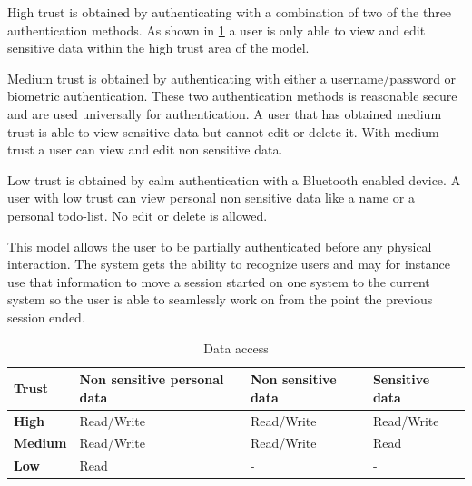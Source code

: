 High trust is obtained by authenticating with a combination of two of the three authentication methods.
As shown in \cref{table_data_access} a user is only able to view and edit sensitive data within the high trust area of the model.

Medium trust is obtained by authenticating with either a username/password or biometric authentication.
These two authentication methods is reasonable secure and are used universally for authentication.
A user that has obtained medium trust is able to view sensitive data but cannot edit or delete it.
With medium trust a user can view and edit non sensitive data.

Low trust is obtained by calm authentication with a Bluetooth enabled device.
A user with low trust can view personal non sensitive data like a name or a personal todo-list.
No edit or delete is allowed.

This model allows the user to be partially authenticated before any physical interaction.
The system gets the ability to recognize users and may for instance use that information to move a session started on one system to the current system so the user is able to seamlessly work on from the point the previous session ended.

\begin{table}[!t]
\caption{Data access}
\label{table_data_access}
\centering
\begin{tabular}{|p{1.3cm}|p{2.0cm}|p{2.0cm}|p{2.0cm}|}
\hline
\textbf{Trust} & \textbf{Non sensitive personal data} & \textbf{Non sensitive data} & \textbf{Sensitive data}\\
\hline
\textbf{High} & Read/Write & Read/Write & Read/Write\\
\hline
\textbf{Medium} & Read/Write & Read/Write & Read\\
\hline
\textbf{Low} & Read & - & -\\
\hline
\end{tabular}
\end{table}